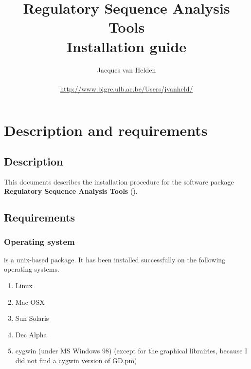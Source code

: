 \documentclass{book}
\begin{document}
\title{Regulatory Sequence Analysis Tools \\
Installation guide}

\author{
	Jacques van Helden \\
	 \\
	\url{http://www.bigre.ulb.ac.be/Users/jvanheld/} \\
	\bigre 
}


\maketitle

\newpage
\tableofcontents
\newpage

\chapter{Description and requirements}

\section{Description}

This documents describes the installation procedure for the software
package \textbf{Regulatory Sequence Analysis Tools} (\RSAT).

\section{Requirements}

\subsection{Operating system}

\RSAT is a unix-based package. It has been installed successfully on
the following operating systems.

\begin{enumerate}
\item Linux

\item Mac OSX

\item Sun Solaris

\item Dec Alpha

\item cygwin (under MS Windows 98) (except for the graphical
librairies, because I did not find a cygwin version of GD.pm)

\end{enumerate}
\end{document}
